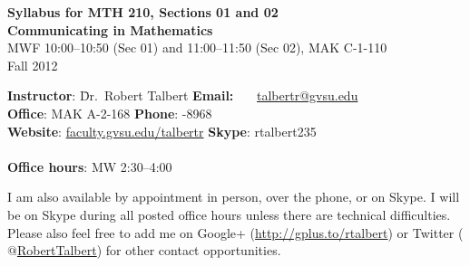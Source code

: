 \documentclass[11pt]{article}
\begin{document}
	
\begin{center}
	{\bfseries Syllabus for MTH 210, Sections 01 and 02} \\
	{\bfseries Communicating in Mathematics} \\
	MWF 10:00--10:50 (Sec 01) and 11:00--11:50 (Sec 02), MAK C-1-110  \\
	Fall 2012
\end{center}

\begin{tabbing}
\textbf{Instructor}: \hspace{0.5in} \= Dr.~Robert Talbert
\hspace{1.4in} \= {\bfseries Email:} \ \ \ \= \href{mailto:talbertr@gvsu.edu}{talbertr@gvsu.edu} \\
\textbf{Office}: \> MAK A-2-168 \> \textbf{Phone}: -8968 \\
\textbf{Website}: \> \href{http://faculty.gvsu.edu/talbertr}{faculty.gvsu.edu/talbertr} \>  \textbf{Skype}: \> rtalbert235 \\

\\

\textbf{Office hours}: \> MW 2:30--4:00 \end{tabbing}
I am also available by appointment in person, over the phone, or on Skype. I will be on Skype during all posted office hours unless there are technical difficulties. Please also feel free to add me on Google+ (\href{http://gplus.to/rtalbert}{http://gplus.to/rtalbert}) or Twitter (\href{http://www.twitter.com/RobertTalbert}{$@$RobertTalbert}) for other contact opportunities.
\end{document}
